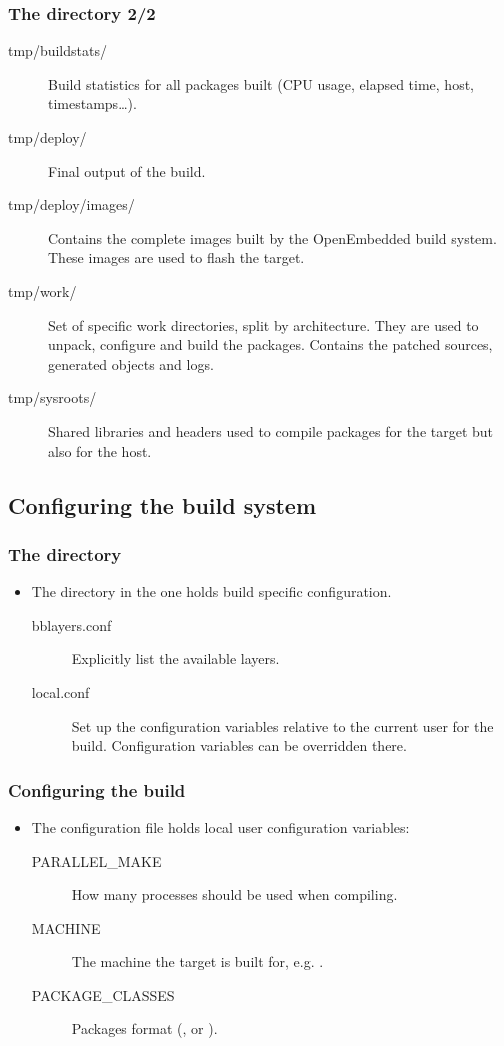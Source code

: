 \begin{frame}
  \frametitle{The  directory 2/2}
  \begin{description}
    \item[tmp/buildstats/] Build statistics for all packages built
      (CPU usage, elapsed time, host, timestamps\dots).
    \item[tmp/deploy/] Final output of the build.
    \item[tmp/deploy/images/] Contains the complete images built by
      the OpenEmbedded build system. These images are used to flash
      the target.
    \item[tmp/work/] Set of specific work directories, split by
      architecture. They are used to unpack, configure and build the
      packages. Contains the patched sources, generated objects and
      logs.
    \item[tmp/sysroots/] Shared libraries and headers used to compile
      packages for the target but also for the host.
  \end{description}
\end{frame}

\subsection{Configuring the build system}

\begin{frame}
  \frametitle{The  directory}
  \begin{itemize}
    \item The  directory in the  one holds 
      build specific configuration.
    \begin{description}
      \item[bblayers.conf] Explicitly list the available layers.
      \item[local.conf] Set up the configuration variables relative to
        the current user for the build. Configuration variables can be
        overridden there.
    \end{description}
  \end{itemize}
\end{frame}

\begin{frame}
  \frametitle{Configuring the build}
  \begin{itemize}
    \item The  configuration file holds local
    user configuration variables:
    \begin{description}
      \item[PARALLEL\_MAKE] How many processes should be used when
        compiling.
      \item[MACHINE] The machine the target is built for, e.g.
        .
      \item[PACKAGE\_CLASSES] Packages format (, 
        or ).
    \end{description}
  \end{itemize}
\end{frame}

